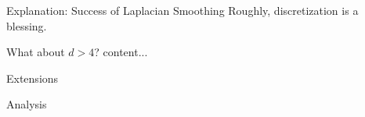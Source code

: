 \documentclass{beamer}
\begin{document}
\begin{frame}{Explanation: Success of Laplacian Smoothing}
Roughly, discretization is a blessing.

\end{frame}


\begin{frame}{What about $d > 4$?}
content...
\end{frame}

\begin{frame}{Extensions}

\end{frame}

\begin{frame}{Analysis}
\end{frame}
\end{document}
